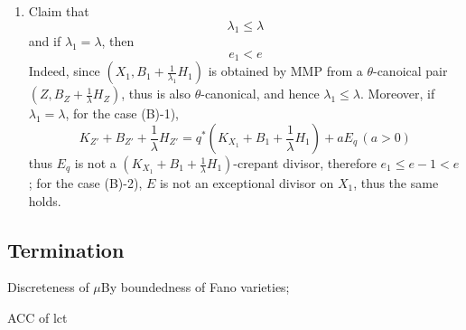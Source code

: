 \documentclass{article}
\begin{document}
\begin{enumerate}[(A)]
\begin{enumerate}[1)]
\item Claim that 
$$ \lambda_1\leqslant \lambda $$
and if $ \lambda_1=\lambda $, then 
$$ e_1<e $$
Indeed, since $ (X_1,B_1+\frac{1}{\lambda_1}H_1) $ is obtained by MMP from a $ \theta $-canoical pair $ (Z,B_Z+\frac{1}{\lambda}H_Z) $, thus is also $ \theta $-canonical, and hence $ \lambda_1\leqslant \lambda $. Moreover, if $ \lambda_1=\lambda $, for the case (B)-1), 
$$ K_{Z'}+B_{Z'}+\frac{1}{\lambda}H_{Z'}=q^*(K_{X_1}+B_1+\frac{1}{\lambda}H_1)+aE_q\, (a>0) $$
thus $ E_q $ is not a $ (K_{X_1}+B_1+\frac{1}{\lambda}H_1) $-crepant divisor, therefore $ e_1\leqslant e-1<e $; for the case (B)-2), $ E $ is not an exceptional divisor on $ X_1 $, thus the same holds.
\end{enumerate} 
\end{enumerate}

\subsection{Termination}
Discreteness of $ \mu $By boundedness of Fano varieties;

ACC of lct
\end{document}
